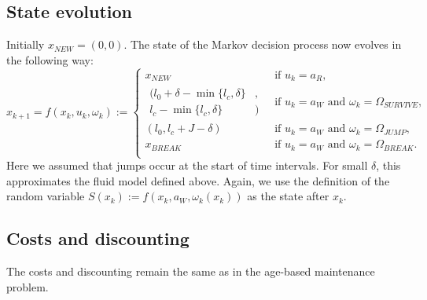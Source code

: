 \documentclass[a4paper]{thesis}
\theoremstyle{definition}
\begin{document}
	\subsection{State evolution}
	Initially $x_{NEW}=(0,0)$.
	The state of the Markov decision process now evolves in the following way:
	\[
	x_{k+1}=f(x_k, u_k, \omega_k):=\begin{cases}
	x_{NEW}&\ \text{if }u_k=a_R,\\
	\begin{split}(l_0+\delta-\min\{l_c,\delta\}&,\\l_c-\min\{l_c,\delta\}&)\end{split}&\ \text{if }u_k=a_W\text{ and }\omega_k=\Omega_{SURVIVE},\\
	(l_0,l_c+J-\delta)&\ \text{if }u_k=a_W\text{ and }\omega_k=\Omega_{JUMP},\\
	x_{BREAK}&\ \text{if }u_k=a_W\text{ and }\omega_k=\Omega_{BREAK}.\\
	\end{cases}
	\]
	Here we assumed that jumps occur at the start of time intervals.
	For small $\delta$, this approximates the fluid model defined above.
	Again, we use the definition of the random variable $S(x_k):=f(x_k,a_W,\omega_k(x_k))$ as the state after $x_k$.
	
	\subsection{Costs and discounting}
	The costs and discounting remain the same as in the age-based maintenance problem.
	
\end{document}

